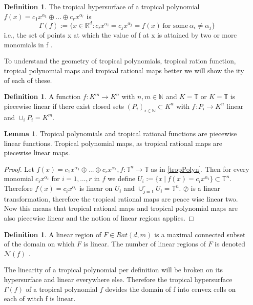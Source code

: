 \documentclass{article}
\theoremstyle{definition}
\newtheorem{lemma}[theorem]{Lemma}
\newtheorem{definition}[theorem]{Definition}
\begin{document}
\begin{definition}
The tropical hypersurface of a tropical polynomial $f(x) = c_1 x^{\alpha_1} \oplus \dots \oplus c_r x^{\alpha_r}$ is 
$$\Gamma(f) := \{ x \in \mathbb{R}^{d} : c_i x^{\alpha_i} = c_j x^{\alpha_j} = f(x) \ \text{for some} \ \alpha_i \neq \alpha_j \}$$
i.e., the set of points x at which the value of f at x is attained by two or more monomials in f \cite[p.~3]{zhang2018tropical}.
\end{definition}

To understand the geometry of tropical polynomials, tropical ration function, tropical polynomial maps and tropical rational maps better we will show the 
ity of each of these.

\begin{definition}
A function $f : K^{m} \to K^{n}$ with $n, m \in \mathbb{N}$ and $K = \mathbb{T}$ or $K = \mathbb{T}$ is piecewise linear if there exist closed sets $(P_{i})_{i \in \mathbb{N}} \subset K^{n}$ with $f : P_{i} \to K^{n}$ linear and $\cup_{i}P_{i} = K^{m}$.
\end{definition}

\begin{lemma}
Tropical polynomials and tropical rational functions are piecewise linear functions. Tropical polynomial maps, as tropical rational maps are piecewise linear maps.
\end{lemma}
\begin{proof}
Let $f(x)=c_{1}x^{\alpha_1} \oplus \dots \oplus c_{r}x^{\alpha_r}, f:\mathbb{T}^{n} \to \mathbb{T}$ as in \ref{tropPolyn}. Then for every monomial $c_{i}x^{\alpha_{i}}$ for $i=1, \dots , r$ in $f$ we define $U_{i} := \{x \ | \ f(x) = c_ix^{\alpha_{i}}\} \subset \mathbb{T}^{n}$. Therefore $f(x) = c_ix^{\alpha_i}$ is linear on $U_{i}$ and   $\cup_{j=1}^{r} U_{i} = \mathbb{T}^{n}$. $\oslash$ is a linear transformation, therefore the tropical rational maps are peace wise linear two. Now this means that tropical rational maps and tropical polynomial maps are also piecewise linear and the notion of linear regions applies.
\end{proof}

\begin{definition}
A linear region of $F \in Rat(d, m)$ is a maximal connected subset of the domain on which $F$ is linear. The number of linear regions of $F$ is denoted $\mathcal{N}(f)$ \cite[p.~4]{zhang2018tropical}.
\end{definition}

The linearity of a tropical polynomial per definition will be broken on its hypersurface and linear everywhere else. Therefore the tropical hypersurface $\Gamma(f)$ of a tropical polynomial $f$ devides the domain of f into cenvex cells on each of witch f is linear.
\end{document}
